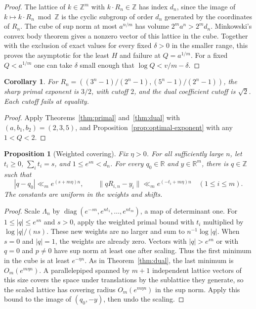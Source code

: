 \documentclass[11pt,a4paper,reqno]{amsart}
\newtheorem{proposition}[theorem]{Proposition}
\newtheorem{corollary}[theorem]{Corollary}
\theoremstyle{definition}
\theoremstyle{remark}
\numberwithin{equation}{section}
\begin{document}
\begin{proof}
The lattice of \(k\in\mathbb Z^m\) with \(k\cdot R_n\in\mathbb Z\)
has index \(d_n\), since the image of \(k\mapsto k\cdot R_n\bmod
\mathbb Z\) is the cyclic subgroup of order \(d_n\)
generated by the coordinates of \(R_n\). The cube of sup norm
at most \(a^{n/m}\) has volume \(2^m a^n>2^m d_n\).
Minkowski's convex body theorem gives a nonzero vector of this
lattice in the cube. Together with the exclusion of exact
values for every fixed \(\delta>0\) in the smaller range, this
proves the asymptotic for the least \(H\) and failure at
\(Q=a^{1/m}\). For a fixed \(Q<a^{1/m}\) one can take \(\delta\)
small enough that \(\log Q<v/m-\delta\).
\end{proof}

\begin{corollary}\label{cor:binary-ternary-quinary}
For \(R_n=((3^n-1)/(2^n-1),(5^n-1)/(2^n-1))\), the sharp
primal exponent is \(3/2\), with cutoff \(2\), and the dual
coefficient cutoff is \(\sqrt{2}\). Each cutoff fails at equality.
\end{corollary}

\begin{proof}
Apply Theorems~\ref{thm:primal} and~\ref{thm:dual} with
\((a,b_1,b_2)=(2,3,5)\), and Proposition~\ref{prop:optimal-exponent}
with any \(1<Q<2\).
\end{proof}

\begin{proposition}[Weighted covering]\label{prop:weighted-covering}
Fix \(\eta>0\). For all sufficiently large \(n\), let
\(t_i\ge0\), \(\sum_i t_i=s\), and \(1\le e^{sn}<d_n\).
For every \(q_0\in\mathbb R\) and \(y\in\mathbb R^m\), there is
\(q\in\mathbb Z\) such that
\[
 |q-q_0|\ll_m e^{(s+m\eta)n},\qquad
 \|qR_{i,n}-y_i\|\ll_m e^{(-t_i+m\eta)n}\quad(1\le i\le m).
\]
The constants are uniform in the weights and shifts.
\end{proposition}

\begin{proof}
Scale \(\Lambda_n\) by
\(\operatorname{diag}(e^{-sn},e^{nt_1},\ldots,e^{nt_m})\),
a map of determinant one.
For \(1\le |q|\le e^{sn}\) and \(s>0\), apply the weighted
primal bound with \(t_i\) multiplied by \(\log|q|/(ns)\).
These new weights are no larger and sum to \(n^{-1}\log|q|\).
When \(s=0\) and \(|q|=1\), the weights are already zero.
Vectors with \(|q|>e^{sn}\) or with \(q=0\) and \(p\ne0\)
have sup norm at least one after scaling.
Thus the first minimum in the cube is at least \(e^{-\eta n}\).
As in Theorem~\ref{thm:dual}, the last minimum is
\(O_m(e^{m\eta n})\). A parallelepiped spanned by \(m+1\)
independent lattice vectors of this size covers the space
under translations by the sublattice they generate, so the
scaled lattice has covering radius \(O_m(e^{m\eta n})\)
in the sup norm. Apply this bound to the image of
\((q_0,-y)\), then undo the scaling.
\end{proof}
\end{document}
